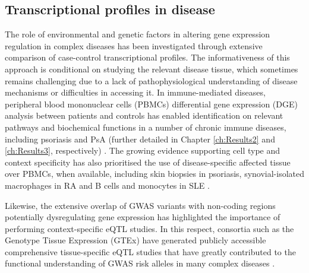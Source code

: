 \subsection{Transcriptional profiles in disease}
The role of environmental and genetic factors in altering gene expression regulation in complex diseases has been investigated through extensive comparison of case-control transcriptional profiles. The informativeness of this approach is conditional on studying the relevant disease tissue, which sometimes remains challenging due to a lack of pathophysiological understanding of disease mechanisms or difficulties in accessing it. In immune-mediated diseases, peripheral blood mononuclear cells (PBMCs) differential gene expression (DGE) analysis between patients and controls has enabled identification on relevant pathways and biochemical functions in a number of chronic immune diseases, including psoriasis and PsA (further detailed in Chapter \ref{ch:Results2} and \ref{ch:Results3}, respectively) \parencite{Miao2013,Junta2009,Baechler2003,Assassi2010,Batliwalla2005}.  The growing evidence supporting cell type and context specificity has also prioritised the use of disease-specific affected tissue over PBMCs, when available, including skin biopsies in psoriasis, synovial-isolated macrophages in RA and B cells and monocytes in SLE \parencite{Katschke2001,Dozmorov2015,Jabbari2012}. 


Likewise, the extensive overlap of GWAS variants with non-coding regions potentially dysregulating gene expression has highlighted the importance of performing context-specific eQTL studies. In this respect, consortia such as the Genotype Tissue Expression (GTEx) have generated publicly accessible comprehensive tissue-specific eQTL studies that have greatly contributed to the functional understanding of GWAS risk alleles in many complex diseases \parencite{Lonsdale2013,Fagny2017}. %


